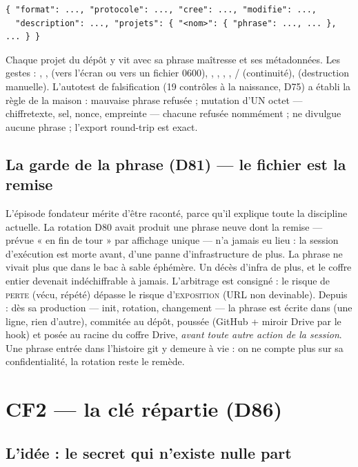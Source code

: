 \begin{lstlisting}
{ "format": ..., "protocole": ..., "cree": ..., "modifie": ...,
  "description": ..., "projets": { "<nom>": { "phrase": ..., ... }, ... } }
\end{lstlisting}

Chaque projet du dépôt y vit avec sa phrase maîtresse et ses métadonnées. Les gestes :
, ,  (vers l'écran ou vers un fichier 0600),
, , , ,
/ (continuité),  (destruction manuelle).
L'autotest de falsification (19 contrôles à la naissance, D75) a établi la règle de la
maison : mauvaise phrase refusée ; mutation d'UN octet — chiffretexte, sel, nonce,
empreinte — chacune refusée nommément ;  ne divulgue aucune phrase ;
l'export round-trip est exact.

\subsection{La garde de la phrase (D81) — le fichier est la remise}

L'épisode fondateur mérite d'être raconté, parce qu'il explique toute la discipline
actuelle. La rotation D80 avait produit une phrase neuve dont la remise — prévue « en
fin de tour » par affichage unique — n'a jamais eu lieu : la session d'exécution est
morte avant, d'une panne d'infrastructure de plus. La phrase ne vivait plus que dans le
bac à sable éphémère. Un décès d'infra de plus, et le coffre entier devenait
indéchiffrable à jamais. L'arbitrage est consigné : le risque de \textsc{perte} (vécu,
répété) dépasse le risque d'\textsc{exposition} (URL non devinable). Depuis : dès sa
production — init, rotation, changement — la phrase est écrite dans
 (une ligne, rien d'autre), commitée au dépôt, poussée
(GitHub + miroir Drive par le hook) et posée au racine du coffre Drive, \emph{avant
toute autre action de la session}. Une phrase entrée dans l'histoire git y demeure à
vie : on ne compte plus sur sa confidentialité, la rotation reste le remède.

\section{CF2 — la clé répartie (D86)}\label{sec:cf2}

\subsection{L'idée : le secret qui n'existe nulle part}

